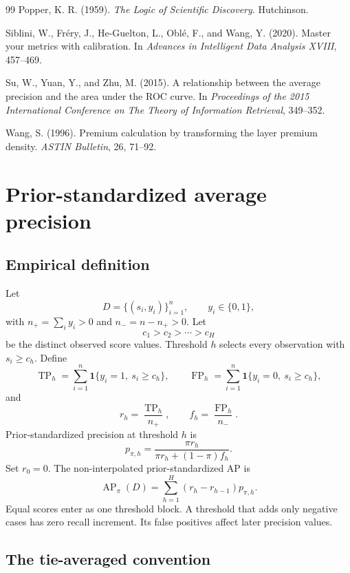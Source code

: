 \documentclass[11pt]{article}
\newcommand{\AP}{\operatorname{AP}}
\theoremstyle{remark}
\begin{document}
\begin{thebibliography}{99}
Popper, K. R. (1959).
\emph{The Logic of Scientific Discovery}.
Hutchinson.

Siblini, W., Fr\'ery, J., He-Guelton, L., Obl\'e, F., and Wang, Y. (2020).
Master your metrics with calibration.
In \emph{Advances in Intelligent Data Analysis XVIII}, 457--469.

Su, W., Yuan, Y., and Zhu, M. (2015).
A relationship between the average precision and the area under the ROC curve.
In \emph{Proceedings of the 2015 International Conference on The Theory of Information Retrieval}, 349--352.

Wang, S. (1996).
Premium calculation by transforming the layer premium density.
\emph{ASTIN Bulletin}, 26, 71--92.

\end{thebibliography}

\appendix

\section{Prior-standardized average precision}
\label{app:ap-definition}

\subsection{Empirical definition}

Let
\[
D=\{(s_i,y_i)\}_{i=1}^{n},
\qquad
y_i\in\{0,1\},
\]
with $n_+=\sum_i y_i>0$ and $n_-=n-n_+>0$. Let
\[
c_1>c_2>\cdots>c_H
\]
be the distinct observed score values. Threshold $h$ selects every observation with $s_i\geq c_h$. Define
\[
\operatorname{TP}_h
=
\sum_{i=1}^{n}
\mathbf{1}\{y_i=1,\ s_i\geq c_h\},
\qquad
\operatorname{FP}_h
=
\sum_{i=1}^{n}
\mathbf{1}\{y_i=0,\ s_i\geq c_h\},
\]
and
\[
r_h=\frac{\operatorname{TP}_h}{n_+},
\qquad
f_h=\frac{\operatorname{FP}_h}{n_-}.
\]
Prior-standardized precision at threshold $h$ is
\[
p_{\pi,h}
=
\frac{\pi r_h}
{\pi r_h+(1-\pi)f_h}.
\]
Set $r_0=0$. The non-interpolated prior-standardized AP is
\begin{equation}
\AP_\pi(D)
=
\sum_{h=1}^{H}
(r_h-r_{h-1})p_{\pi,h}.
\label{eq:empirical-ap}
\end{equation}
Equal scores enter as one threshold block. A threshold that adds only negative cases has zero recall increment. Its false positives affect later precision values.

\subsection{The tie-averaged convention}
\label{app:tie-convention}
\end{document}
